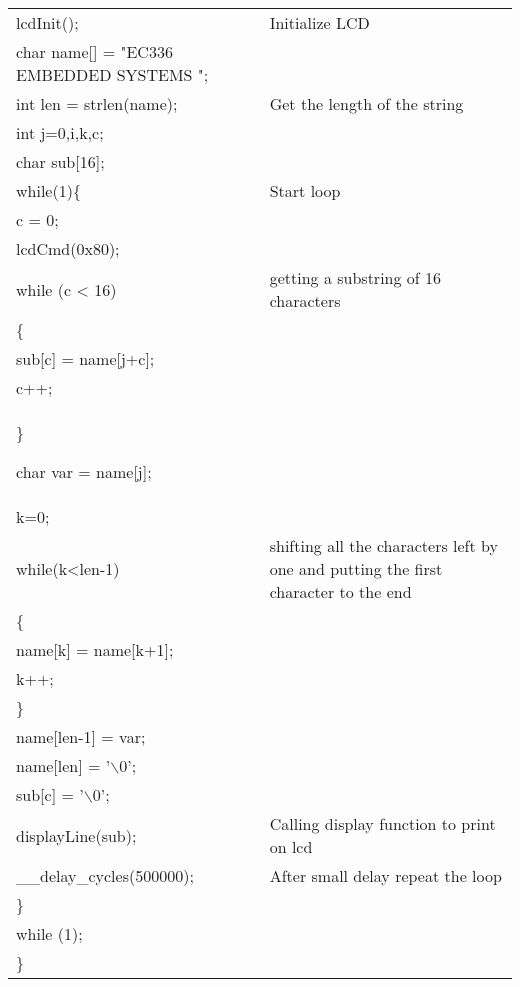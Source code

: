 \documentclass[12pt, letterpaper]{article}
\newcommand\tab[1][1cm]{\hspace*{#1}}
\begin{document}
\begin{longtable}{|p{6cm}||p{5cm}|}
        
        \tab lcdInit(); & Initialize LCD\\
        
        
         \tab char name[] = "EC336 EMBEDDED SYSTEMS "; & \\
        \tab int len = strlen(name); & Get the length of the string\\
        \tab int j=0,i,k,c; & \\
        \tab char sub[16]; & \\
        
        
        \tab while(1)\{ & Start loop\\
          \tab \tab      c = 0; & \\
           \tab \tab     lcdCmd(0x80); & \\
                
                
 
                \tab while (c < 16) & getting a substring of 16 characters\\
               \tab \{ & \\
                 \tab \tab sub[c] = name[j+c]; & \\
                  \tab \tab c++;&\\
               \tab \}
                
                
 
             \tab   char var = name[j]; & \\
             \tab   k=0; & \\
              \tab  while(k<len-1) & shifting all the characters left by one and putting the first character to the end \\
             \tab   \{ & \\
              \tab \tab          name[k] = name[k+1]; & \\
              \tab \tab          k++; & \\
               \tab \} & \\
                \tab name[len-1] = var; & \\
               \tab  name[len] = '$\backslash$0'; & \\
              \tab  sub[c] = '$\backslash$0'; & \\
             \tab   displayLine(sub); & Calling display function to print on lcd\\
             \tab   \_\_delay\_cycles(500000); & After small delay repeat the loop\\


        \} & \\


        while (1); & \\
\} & \\




\end{longtable}
\end{document}
